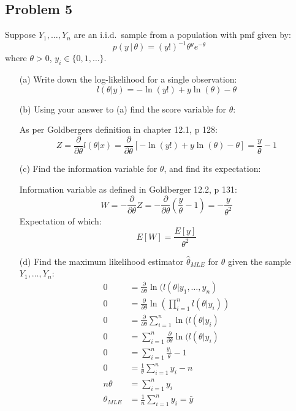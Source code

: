 \documentclass{article}
\newcommand{\1}{\mathbf{1}}
\begin{document}
\newpage
\subsection*{Problem 5}

Suppose $Y_1,\ldots, Y_n$ are an i.i.d.~sample from a population with pmf given by:
\begin{equation}
    p(y\, |\, \theta) = (y!)^{-1} \theta^y e^{-\theta} 
\end{equation}
where {$\theta > 0$}, $y_i \in \{0,1,\ldots \}$.
\begin{itemize}
    \item[(a)] Write down the log-likelihood for a single observation:
    $$l(\theta|y) = -\ln(y!) + y\ln(\theta) - \theta$$

    \item[(b)] Using your answer to (a) find the score variable for $\theta$:
    
    As per Goldbergers definition in chapter 12.1, p 128:
    $$ Z = \frac{\partial}{\partial\theta} l(\theta|x) = \frac{\partial}{\partial\theta}\left[  -\ln(y!) + y\ln(\theta) - \theta  \right] = \frac{y}{\theta} -1$$

    \item[(c)] Find the information variable for $\theta$, and find its expectation:
    
    Information variable as defined in Goldberger 12.2, p 131:
    $$W = -\frac{\partial}{\partial\theta} Z = -\frac{\partial}{\partial\theta } \left(\frac{y}{\theta} -1\right) = - \frac{y}{\theta^2}$$
    Expectation of which:
    $$E[W] = \frac{E[y]}{\theta^2}$$

    \item[(d)]  Find the maximum likelihood estimator $\hat{\theta}_{MLE}$ for $\theta$ given the sample $Y_1,\ldots, Y_n$:
    \begin{align*}
        0 &= \frac{\partial}{\partial\theta} \ln(l(\theta|y_1,\hdots ,y_n) \\
        0 &= \frac{\partial}{\partial\theta} \ln\left( \prod_{i=1}^n l(\theta|y_i) \right) \\
        0 &= \frac{\partial}{\partial\theta} \sum_{i=1}^n \ln(l(\theta|y_i) \\
        0 &= \sum_{i=1}^n \frac{\partial}{\partial\theta} \ln(l(\theta|y_i) \\
        0 &= \sum_{i=1}^n \frac{y_i}{\theta} -1 \\
        0 &= \frac{1}{\theta} \sum_{i=1}^n y_i - n \\
        n\theta  &= \sum_{i=1}^n y_i \\
        \theta_{MLE} &= \frac{1}{n} \sum_{i=1}^n y_i = \bar y 
    \end{align*}


\end{itemize}
\end{document}
